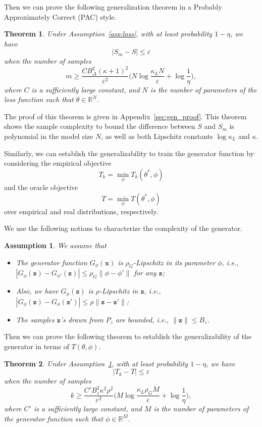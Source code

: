 \documentclass[11pt,fullpage, letterpaper,twoside]{article}
\newtheorem{theorem}{Theorem}
\newtheorem{assumption}{Assumption}
\newcommand{\1}[1]{\mathds{1}_{\left[#1\right]}}
\begin{document}
Then we can prove the following generalization theorem in a Probably Approximately Correct (PAC) style.
\begin{theorem}\label{thm:generalization}
Under Assumption~\ref{asp:loss}, with at least probability $1-\eta$, we have
$$
|S_m - S|\leq \varepsilon
$$
when the number of samples
$$
m\geq\dfrac{C B_\Delta^2(\kappa+1)^2}{\varepsilon^2} \big(N \log\dfrac{\kappa_L N}{\varepsilon}+\log\dfrac{1}{\eta}\big),$$
where $C$ is a sufficiently large constant, and $N$ is the number of parameters of the loss function such that $\theta\in\mathbb R^N$.
\end{theorem}
The proof of this theorem is given in Appendix~\ref{sec:gen_proof}. This theorem shows the sample complexity to bound the difference between $S$ and $S_m$ is polynomial in the model size $N$, as well as both Lipschitz constants $\log\kappa_L$ and $\kappa$.




Similarly, we can establish the generalizability to train the generator function by considering the empirical objective
$$
T_k = \min_{\phi} T_k(\theta^*,\phi)
$$
and the oracle objective
$$
T = \min_\phi T(\theta^*,\phi)
$$
over empirical and real distributions, respectively.

We use the following notions to characterize the complexity of the generator.
\begin{assumption}\label{asp:generator}
We assume that
\begin{itemize}
\item[I.] The generator function $G_\phi(\mathbf x)$ is $\rho_G$-Lipschitz in its parameter $\phi$, i.e., $|G_\phi(\mathbf z)-G_{\phi'}(\mathbf z)|\leq \rho_G\|\phi-\phi'\|$ for any $\mathbf z$;
\item[II.] Also, we have $G_\phi(\mathbf z)$ is $\rho$-Lipschitz in $\mathbf z$, i.e., $|G_\phi(\mathbf z)-G_\phi(\mathbf z')|\leq\rho\|\mathbf z-\mathbf z'\|$;
\item[III.] The samples $\mathbf z$'s drawn from $P_z$ are bounded, i.e., $\|\mathbf z\|\leq B_z$.
\end{itemize}
\end{assumption}

Then we can prove the following theorem to establish the generalizability of the generator in terms of $T(\theta,\phi)$.
\begin{theorem}Under Assumption~\ref{asp:generator}, with at least probability $1-\eta$, we have
$$
|T_k - T|\leq \varepsilon
$$
when the number of samples
$$
k\geq\dfrac{C' B_z^2\kappa^2\rho^2}{\varepsilon^2} \big(M\log\dfrac{\kappa_L \rho_G M}{\varepsilon}+\log\dfrac{1}{\eta}\big),
$$
where $C'$ is a sufficiently large constant, and $M$ is the number of parameters of the generator function such that $\phi\in\mathbb R^M$.
\end{theorem}
\end{document}
